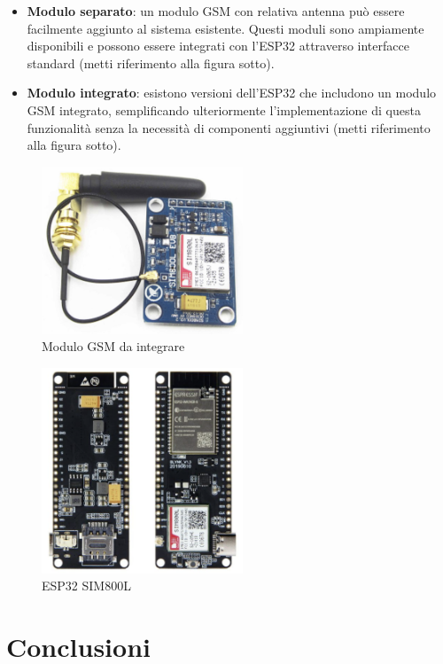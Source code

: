 \documentclass[12pt, a4paper, italian]{report}
\numberwithin{figure}{chapter}
\numberwithin{table}{chapter}
\begin{document}
\begin{itemize}
    \item \textbf{Modulo separato}: un modulo GSM con relativa antenna può essere facilmente aggiunto al sistema esistente. Questi moduli sono ampiamente disponibili e possono essere integrati con l'ESP32 attraverso interfacce standard (metti riferimento alla figura sotto).
    \item \textbf{Modulo integrato}: esistono versioni dell'ESP32 che includono un modulo GSM integrato, semplificando ulteriormente l'implementazione di questa funzionalità senza la necessità di componenti aggiuntivi (metti riferimento alla figura sotto).
\end{itemize}

\begin{figure}[h]
  \centering
  \includegraphics[width=6cm]{gsm_module.png}
  \caption{Modulo GSM da integrare}
  \label{fig:modulo_gsm}
\end{figure}

\begin{figure}[h]
  \centering
  \includegraphics[width=6cm]{esp32_gsm.png}
  \caption{ESP32 SIM800L}
  \label{fig:esp32_gsm}
\end{figure}

\chapter{Conclusioni}
\end{document}

